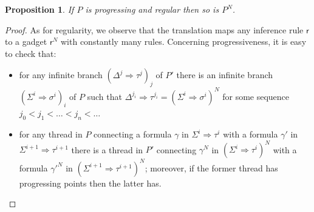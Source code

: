 \documentclass[10pt,a4paper]{amsart}
\theoremstyle{plain}
\newtheorem{proposition}[proposition]{Proposition}
\theoremstyle{definition}
\theoremstyle{plain}
\theoremstyle{definition} %
\newcommand{\nat}{\mathit{N}}
\newcommand{\N}{\nat} %
\newcommand{\seqar}{\Rightarrow}
\newcommand{\infrule}{\mathsf{r}}
\newcommand{\rrule}{\infrule} %
\newcommand{\der}{P}
\newcommand{\negtrans}[1]{{#1}^{\N}}
\begin{document}
\begin{proposition}\label{prop:translation-preserves-progressiveness}
        If $\der$ is progressing and regular then so is $\negtrans \der$.
\end{proposition}
\begin{proof}
    As for regularity, we observe that the translation maps any inference rule $\rrule$ to a gadget $\negtrans \rrule$ with constantly many rules. Concerning progressiveness, it is easy to check that:
    \begin{itemize}
        \item  for any infinite branch $(\Delta^j \seqar \tau^j)_j$ of $\der'$ there is an infinite branch $(\Sigma^i \seqar \sigma^i)_i$ of $\der$ such that $\Delta^{j_i} \seqar \tau^{j_i}= \negtrans{(\Sigma^i \seqar \sigma^i)}$ for some sequence  $j_0<j_1<\ldots<j_n<\ldots$
        \item  for any thread  in $\der$ connecting a formula $\gamma$ in $\Sigma^i \seqar \tau^i$ with a formula $\gamma'$ in $\Sigma^{i+1} \seqar \tau^{i+1}$ there is a thread  in $\der'$ connecting $\negtrans \gamma$ in $\negtrans{(\Sigma^i \seqar \tau^i)}$ with a formula $\negtrans{\gamma'}$ in $\negtrans{(\Sigma^{i+1} \seqar \tau^{i+1})}$; moreover, if the former thread has progressing points then the latter has. \qedhere
    \end{itemize}
\end{proof}
\end{document}
